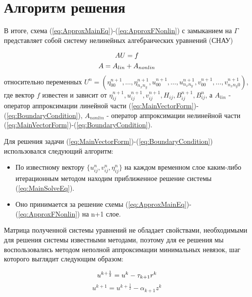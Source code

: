 \newpage
\addtocounter{section}{1}
\setcounter{subsection}{0}
\setcounter{equation}{0}
\section*{Алгоритм решения}

В итоге, схема (\ref{eq:ApproxMainEq})-(\ref{eq:ApproxFNonlin}) с замыканием на $\Gamma$ представляет собой систему нелинейных алгебраических уравнений (СНАУ)

\begin{gather}
    AU=f\notag\\
    A=A_{lin}+A_{nonlin}
    \label{eq:MainSolveEq}
\end{gather}
относительно переменных $U^n=(\eta^{n+1}_{00},\ldots,\eta^{n+1}_{n_xn_y},u^{n+1}_{00},\ldots,u^{n+1}_{n_xn_y},v^{n+1}_{00},\ldots,v^{n+1}_{n_xn_y0})$, где вектор $f$ известен и зависит от $\eta^{n+1}_{ij},u^{n+1}_{ij},v^{n+1}_{ij},H_{ij},B^{n+1}_{ij},B^{n}_{ij}$, а $A_{lin}$ - оператор аппроксимации линейной части (\ref{eq:MainVectorForm})-(\ref{eq:BoundaryCondition}), $A_{nonlin}$ - оператор аппроксимации нелинейной части (\ref{eq:MainVectorForm})-(\ref{eq:BoundaryCondition}).

Для решения задачи (\ref{eq:MainVectorForm})-(\ref{eq:BoundaryCondition}) использовался следующий алгоритм:
\begin{itemize}
    \item По известному вектору $\{u_{ij}^n,v_{ij}^n,\eta_{ij}^n\}$ на каждом временном слое каким-либо итерационным методом находим приближенное решение системы (\ref{eq:MainSolveEq}).
    \item Оно принимается за решение схемы (\ref{eq:ApproxMainEq})-(\ref{eq:ApproxFNonlin}) на n+1 слое.
\end{itemize}

Матрица полученной системы уравнений не обладает свойствами, необходимыми для решения системы известными методами, поэтому для ее решения мы воспользовались методом неполной аппроксимации минимальных невязок, шаг которого выглядит следующим образом:

\begin{equation}
    \label{FirstMethodStep}
    u^{k+\frac{1}{2}}=u^k-\tau_{k+1}r^k\\
\end{equation}
\begin{equation}
    \label{SecondMethodStep}
    u^{k+1}=u^{k+\frac{1}{2}}-\alpha_{k+1}z^k
\end{equation}

